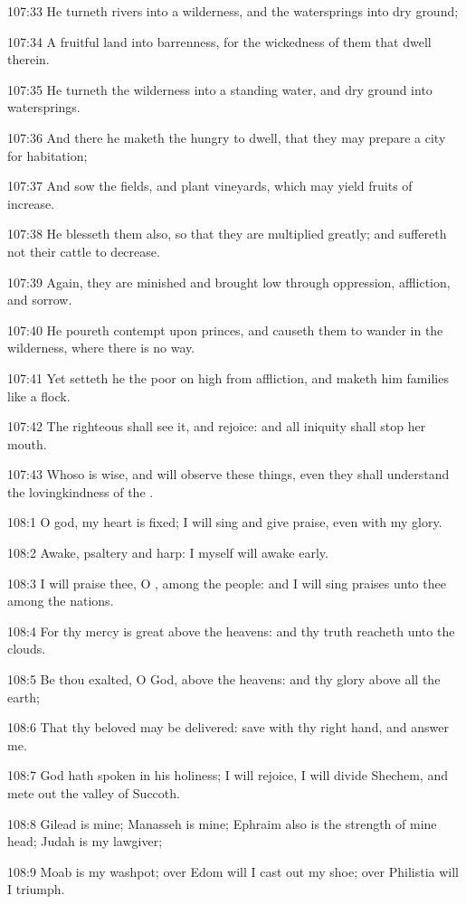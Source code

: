 107:33 He turneth rivers into a wilderness, and the watersprings into dry ground;

107:34 A fruitful land into barrenness, for the wickedness of them that dwell therein.

107:35 He turneth the wilderness into a standing water, and dry ground into watersprings.

107:36 And there he maketh the hungry to dwell, that they may prepare a city for habitation;

107:37 And sow the fields, and plant vineyards, which may yield fruits of increase.

107:38 He blesseth them also, so that they are multiplied greatly; and suffereth not their cattle to decrease.

107:39 Again, they are minished and brought low through oppression, affliction, and sorrow.

107:40 He poureth contempt upon princes, and causeth them to wander in the wilderness, where there is no way.

107:41 Yet setteth he the poor on high from affliction, and maketh him families like a flock.

107:42 The righteous shall see it, and rejoice: and all iniquity shall stop her mouth.

107:43 Whoso is wise, and will observe these things, even they shall understand the lovingkindness of the \LORD.



108:1 O god, my heart is fixed; I will sing and give praise, even with my glory.

108:2 Awake, psaltery and harp: I myself will awake early.

108:3 I will praise thee, O \LORD, among the people: and I will sing praises unto thee among the nations.

108:4 For thy mercy is great above the heavens: and thy truth reacheth unto the clouds.

108:5 Be thou exalted, O God, above the heavens: and thy glory above all the earth;

108:6 That thy beloved may be delivered: save with thy right hand, and answer me.

108:7 God hath spoken in his holiness; I will rejoice, I will divide Shechem, and mete out the valley of Succoth.

108:8 Gilead is mine; Manasseh is mine; Ephraim also is the strength of mine head; Judah is my lawgiver;

108:9 Moab is my washpot; over Edom will I cast out my shoe; over Philistia will I triumph.

